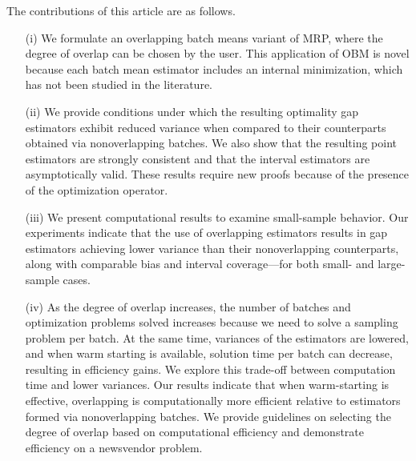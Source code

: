 \documentclass[12pt]{article}
\begin{document}
The contributions of this article are as follows. 
\begin{itemize}
\item[(i)] We formulate an overlapping batch means variant of MRP, where the degree of overlap can be chosen by the user. 
This application of OBM is novel because each batch mean estimator includes an internal minimization, which has not been studied in the literature.

\item[(ii)] We provide conditions under which the resulting optimality gap estimators exhibit reduced variance when compared to their counterparts obtained via nonoverlapping batches.
We also show that the resulting point estimators are strongly consistent and that the interval estimators are asymptotically valid. 
These results require new proofs because of the presence of the optimization operator. 

\item[(iii)] We  present computational results to examine small-sample behavior. 
Our experiments indicate that the use of overlapping estimators results in gap estimators achieving lower variance than their nonoverlapping counterparts, along with comparable bias and interval coverage---for both small- and large-sample cases.

\item[(iv)] As the degree of overlap increases, the number of batches and optimization problems solved increases because we need to solve a sampling problem per batch. 
At the same time, variances of the estimators are lowered, and when warm starting is available, solution time per batch can decrease, resulting in efficiency gains. 
We explore this trade-off between computation time and lower variances.
Our results indicate that when warm-starting is effective, overlapping is computationally more efficient relative to estimators formed via nonoverlapping batches.
We provide guidelines on selecting the degree of overlap based on computational efficiency and demonstrate efficiency on a newsvendor problem. 
\end{itemize}
\end{document}
